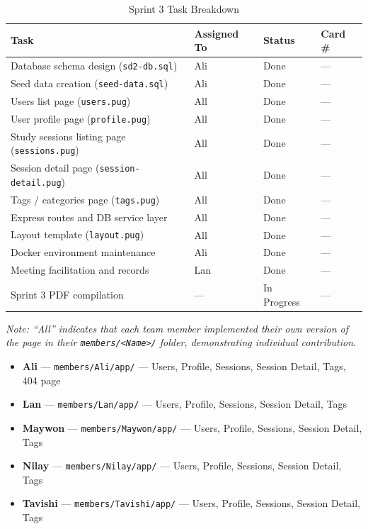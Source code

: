 \documentclass[11pt,a4paper]{article}
\begin{document}
\begin{table}[H]
\centering
\begin{tabularx}{\textwidth}{Xlll}
    \toprule
    \textbf{Task} & \textbf{Assigned To} & \textbf{Status} & \textbf{Card \#} \\
    \midrule
    Database schema design (\texttt{sd2-db.sql})          & Ali       & Done & — \\
    Seed data creation (\texttt{seed-data.sql})            & Ali       & Done & — \\
    Users list page (\texttt{users.pug})                   & All       & Done & — \\
    User profile page (\texttt{profile.pug})               & All       & Done & — \\
    Study sessions listing page (\texttt{sessions.pug})    & All       & Done & — \\
    Session detail page (\texttt{session-detail.pug})      & All       & Done & — \\
    Tags / categories page (\texttt{tags.pug})             & All       & Done & — \\
    Express routes and DB service layer                    & All       & Done & — \\
    Layout template (\texttt{layout.pug})                  & All       & Done & — \\
    Docker environment maintenance                         & Ali       & Done & — \\
    Meeting facilitation and records                       & Lan       & Done & — \\
    Sprint 3 PDF compilation                               & —         & In Progress & — \\
    \bottomrule
\end{tabularx}
\caption{Sprint 3 Task Breakdown}
\end{table}

\textit{Note: ``All'' indicates that each team member implemented their own version of the page in their \texttt{members/<Name>/} folder, demonstrating individual contribution.}

\begin{itemize}[nosep]
    \item \textbf{Ali} — \texttt{members/Ali/app/} — Users, Profile, Sessions, Session Detail, Tags, 404 page
    \item \textbf{Lan} — \texttt{members/Lan/app/} — Users, Profile, Sessions, Session Detail, Tags
    \item \textbf{Maywon} — \texttt{members/Maywon/app/} — Users, Profile, Sessions, Session Detail, Tags
    \item \textbf{Nilay} — \texttt{members/Nilay/app/} — Users, Profile, Sessions, Session Detail, Tags
    \item \textbf{Tavishi} — \texttt{members/Tavishi/app/} — Users, Profile, Sessions, Session Detail, Tags
\end{itemize}
\end{document}

